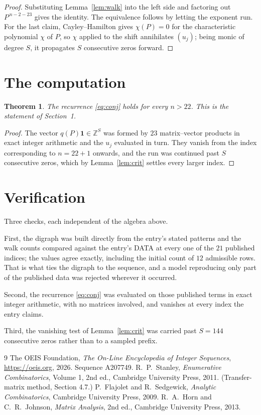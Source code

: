 \documentclass[11pt,a4paper]{article}
\theoremstyle{plain}
\newtheorem{theorem}{Theorem}
\theoremstyle{definition}
\begin{document}
\begin{proof}
Substituting Lemma~\ref{lem:walk} into the left side and factoring out
$P^{\,n-2-23}$ gives the identity. The equivalence follows by letting the exponent
run. For the last claim, Cayley--Hamilton gives $\chi(P)=0$ for the characteristic
polynomial $\chi$ of $P$, so $\chi$ applied to the shift annihilates $(u_j)$; being monic of
degree $S$, it propagates $S$ consecutive zeros forward.
\end{proof}

\section{The computation}

\begin{theorem}
The recurrence \eqref{eq:conj} holds for every $n>22$. This is the statement of
Section~1.
\end{theorem}

\begin{proof}
The vector $q(P)\mathbf{1}\in\mathbb{Z}^{S}$ was formed by $23$ matrix--vector
products in exact integer arithmetic and the $u_j$ evaluated in turn. They vanish from the
index corresponding to $n=22+1$ onwards, and the run was continued past $S$ consecutive
zeros, which by Lemma~\ref{lem:crit} settles every larger index.
\end{proof}

\section{Verification}

Three checks, each independent of the algebra above.

First, the digraph was built directly from the entry's stated patterns and the walk counts
compared against the entry's DATA at every one of the $21$ published indices; the
values agree exactly, including the initial count of $12$ admissible rows. That is
what ties the digraph to the sequence, and a model reproducing only part of the published
data was rejected wherever it occurred.

Second, the recurrence \eqref{eq:conj} was evaluated on those published terms in exact
integer arithmetic, with no matrices involved, and vanishes at every index the entry claims.

Third, the vanishing test of Lemma~\ref{lem:crit} was carried past $S=144$ consecutive
zeros rather than to a sampled prefix.

\begin{thebibliography}{9}
 The OEIS Foundation, \emph{The On-Line Encyclopedia of Integer
Sequences}, \url{https://oeis.org}, 2026. Sequence A207749.
 R.~P.~Stanley, \emph{Enumerative Combinatorics}, Volume 1, 2nd ed.,
Cambridge University Press, 2011. (Transfer-matrix method, Section 4.7.)
 P.~Flajolet and R.~Sedgewick, \emph{Analytic Combinatorics}, Cambridge
University Press, 2009.
 R.~A.~Horn and C.~R.~Johnson, \emph{Matrix Analysis}, 2nd ed., Cambridge
University Press, 2013.
\end{thebibliography}
\end{document}
